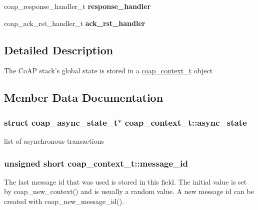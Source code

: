 \begin{DoxyCompactItemize}
\item 
\hypertarget{structcoap__context__t_aaeae5156b5641ce3a0bb6d13f5c226d2}{}coap\+\_\+response\+\_\+handler\+\_\+t {\bfseries response\+\_\+handler}\label{structcoap__context__t_aaeae5156b5641ce3a0bb6d13f5c226d2}

\item 
\hypertarget{structcoap__context__t_a9f095f3f2793a6102e70f1d60b696fe3}{}coap\+\_\+ack\+\_\+rst\+\_\+handler\+\_\+t {\bfseries ack\+\_\+rst\+\_\+handler}\label{structcoap__context__t_a9f095f3f2793a6102e70f1d60b696fe3}

\end{DoxyCompactItemize}


\subsection{Detailed Description}
The Co\+A\+P stack's global state is stored in a \hyperlink{structcoap__context__t}{coap\+\_\+context\+\_\+t} object 

\subsection{Member Data Documentation}
\hypertarget{structcoap__context__t_a4f287951eac36a9488fd9524eb1cbdb8}{}
\subsubsection[{async\+\_\+state}]{\setlength{\rightskip}{0pt plus 5cm}struct {\bf coap\+\_\+async\+\_\+state\+\_\+t}$\ast$ coap\+\_\+context\+\_\+t\+::async\+\_\+state}\label{structcoap__context__t_a4f287951eac36a9488fd9524eb1cbdb8}
list of asynchronous transactions \hypertarget{structcoap__context__t_a394ef9edc0510b05ddc7aeaa48110fcd}{}
\subsubsection[{message\+\_\+id}]{\setlength{\rightskip}{0pt plus 5cm}unsigned short coap\+\_\+context\+\_\+t\+::message\+\_\+id}\label{structcoap__context__t_a394ef9edc0510b05ddc7aeaa48110fcd}
The last message id that was used is stored in this field. The initial value is set by coap\+\_\+new\+\_\+context() and is usually a random value. A new message id can be created with coap\+\_\+new\+\_\+message\+\_\+id(). \hypertarget{structcoap__context__t_a0c362c57200374b1e7d2331ec3994485}{}
